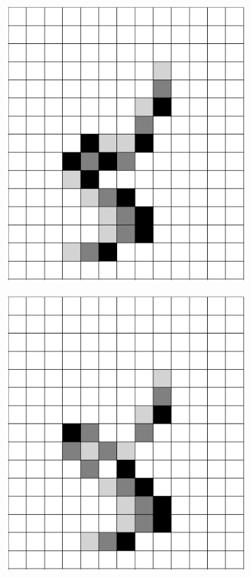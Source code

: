 \documentclass[12pt]{article}
\numberwithin{figure}{section} %
\begin{document}
\begin{figure}[H]
\begin{subfigure}{0.23\textwidth}
     	\subcaption{}
   	\end{subfigure}
	\begin{subfigure}{0.23\textwidth}
     	\includegraphics[width=\linewidth]{Section4/36.2}
     	\subcaption{}
   	\end{subfigure}
    	\begin{subfigure}{0.23\textwidth}
     	\includegraphics[width=\linewidth]{Section4/36.3}

\end{subfigure}
\end{figure}
\end{document}
